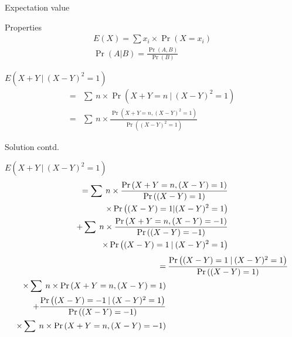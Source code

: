 \documentclass{beamer}
\providecommand{\brak}[1]{\ensuremath{\left(#1\right)}}
\begin{document}
\begin{frame}{Expectation value}
    \begin{block}{Properties}
        \begin{align}
            E\brak{X}=\sum x_{i}\times\Pr\brak{X=x_{i}}\\
            \Pr\brak{A|B}=\frac{\Pr\brak{A,B}}{\Pr\brak{B}}
        \end{align}
    \end{block}
    \begin{block}{}
        $E\brak{X+Y\:|\:(X-Y)^2=1}$
        \begin{align}
            =&\sum\:n\times\Pr\brak{X+Y=n\:|\:(X-Y)^2=1}\\
            =&\sum\:n\times\frac{\Pr\brak{X+Y=n,(X-Y)^2=1}}{\Pr\brak{(X-Y)^2=1}}
        \end{align}
    \end{block}
\end{frame}
\begin{frame}{Solution contd.}
\begin{block}{}
$E\brak{X+Y\:|\:(X-Y)^2=1}$
    \begin{align}
        \begin{split}
            =\sum\:n\times\frac{\Pr\brak{X+Y=n,(X-Y)=1}}{\Pr\brak{(X-Y)=1}}
            \bigskip\\
            \times\Pr\brak{(X-Y)=1|(X-Y)^2=1}
            \bigskip\\
            +\sum\:n\times\frac{\Pr\brak{X+Y=n,(X-Y)=-1}}{\Pr\brak{(X-Y)=-1}}
            \bigskip\\
            \times\Pr\brak{(X-Y)=1\:|\:(X-Y)^2=1}
        \end{split}
    \end{align}
    \begin{align}
        \begin{split}
            =&\:\frac{\Pr\brak{(X-Y)=1\:|\:(X-Y)^2=1}}{\Pr\brak{(X-Y)=1}}
            \bigskip\\
            \times\sum\:n\times\Pr\brak{X+Y=n,(X-Y)=1}
            \bigskip\\
            +\frac{\Pr\brak{(X-Y)=-1\:|\:(X-Y)^2=1}}{\Pr\brak{(X-Y)=-1}}
            \bigskip\\
            \times\sum\:n\times\Pr\brak{X+Y=n,(X-Y)=-1}\label{0.0.18}
        \end{split}
    \end{align}
    \end{block}
\end{frame}
\end{document}
